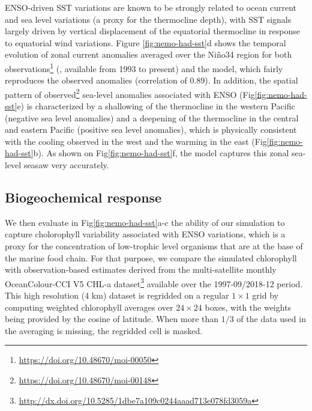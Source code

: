 ENSO-driven SST variations are known to be strongly related to ocean current and sea level variations (a proxy for the thermocline depth), with SST signals largely driven by vertical displacement of the equatorial thermocline in response to equatorial wind variations. Figure \ref{fig:nemo-had-sst}d shows the temporal evolution of zonal current anomalies averaged over the Niño34 region for both observations\footnote{\url{https://doi.org/10.48670/moi-00050}} (\citealp{rioGOCEOceanCirculation2014}, available from 1993 to present) and the model, which fairly reproduces the observed anomalies (correlation of 0.89).
In addition, the spatial pattern of observed\footnote{\url{https://doi.org/10.48670/moi-00148}} sea-level anomalies associated with ENSO (Fig\ref{fig:nemo-had-sst}e) is characterized by a shallowing of the thermocline  in the western Pacific (negative sea level anomalies) and a deepening of the thermocline  in the central and eastern Pacific (positive sea level anomalies), which is physically consistent with the cooling observed in the west and the warming in the east (Fig\ref{fig:nemo-had-sst}b). As shown on Fig\ref{fig:nemo-had-sst}f, the model captures this zonal sea-level seasaw very accurately.

\subsection{Biogeochemical response}

We then evaluate in Fig\ref{fig:nemo-had-sst}a-c the ability of our simulation to capture cholorophyll variability associated with ENSO variations, which is a proxy for the concentration of low-trophic level organisms that are at the base of the marine food chain. For that purpose, we compare the simulated chlorophyll with observation-based estimates derived from the multi-satellite monthly OceanColour-CCI V5 CHL-a dataset\footnote{\url{http://dx.doi.org/10.5285/1dbe7a109c0244aaad713e078fd3059a}} \citep{sathyendranathOceanColourTimeSeries2019} available over the 1997-09/2018-12 period. This high resolution (4 km)  dataset is regridded on a regular $1\times 1$ grid by computing weighted chlorophyll averages over $24\times24$ boxes, with the weights being provided by the cosine of latitude. When more than $1/3$ of the data used in the averaging is missing, the regridded cell is masked.

